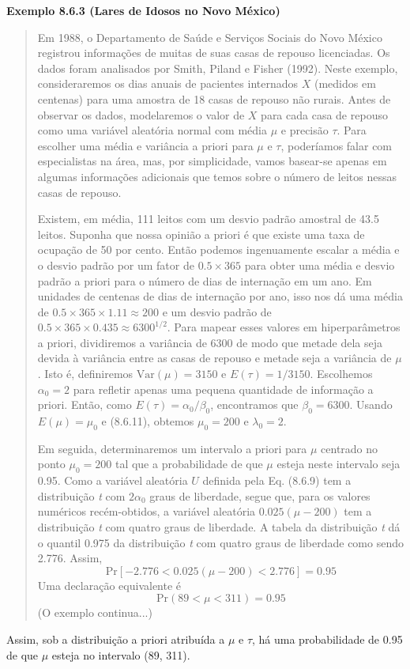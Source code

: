 \vspace{1em}
\noindent\textbf{Exemplo 8.6.3 (Lares de Idosos no Novo México)}
\begin{quote}
    Em 1988, o Departamento de Saúde e Serviços Sociais do Novo México registrou informações de muitas de suas casas de repouso licenciadas. Os dados foram analisados por Smith, Piland e Fisher (1992). Neste exemplo, consideraremos os dias anuais de pacientes internados $X$ (medidos em centenas) para uma amostra de 18 casas de repouso não rurais. Antes de observar os dados, modelaremos o valor de $X$ para cada casa de repouso como uma variável aleatória normal com média $\mu$ e precisão $\tau$. Para escolher uma média e variância a priori para $\mu$ e $\tau$, poderíamos falar com especialistas na área, mas, por simplicidade, vamos basear-se apenas em algumas informações adicionais que temos sobre o número de leitos nessas casas de repouso.

    Existem, em média, 111 leitos com um desvio padrão amostral de 43.5 leitos. Suponha que nossa opinião a priori é que existe uma taxa de ocupação de 50 por cento. Então podemos ingenuamente escalar a média e o desvio padrão por um fator de $0.5 \times 365$ para obter uma média e desvio padrão a priori para o número de dias de internação em um ano. Em unidades de centenas de dias de internação por ano, isso nos dá uma média de $0.5 \times 365 \times 1.11 \approx 200$ e um desvio padrão de $0.5 \times 365 \times 0.435 \approx 6300^{1/2}$. Para mapear esses valores em hiperparâmetros a priori, dividiremos a variância de 6300 de modo que metade dela seja devida à variância entre as casas de repouso e metade seja a variância de $\mu$. Isto é, definiremos $\text{Var}(\mu) = 3150$ e $E(\tau) = 1/3150$. Escolhemos $\alpha_0 = 2$ para refletir apenas uma pequena quantidade de informação a priori. Então, como $E(\tau) = \alpha_0/\beta_0$, encontramos que $\beta_0 = 6300$. Usando $E(\mu) = \mu_0$ e (8.6.11), obtemos $\mu_0 = 200$ e $\lambda_0 = 2$.

    Em seguida, determinaremos um intervalo a priori para $\mu$ centrado no ponto $\mu_0 = 200$ tal que a probabilidade de que $\mu$ esteja neste intervalo seja 0.95. Como a variável aleatória $U$ definida pela Eq. (8.6.9) tem a distribuição \textit{t} com $2\alpha_0$ graus de liberdade, segue que, para os valores numéricos recém-obtidos, a variável aleatória $0.025(\mu - 200)$ tem a distribuição \textit{t} com quatro graus de liberdade. A tabela da distribuição \textit{t} dá o quantil 0.975 da distribuição \textit{t} com quatro graus de liberdade como sendo 2.776. Assim,
    \begin{equation} \label{eq:8.6.13}
        \text{Pr}[-2.776 < 0.025(\mu - 200) < 2.776] = 0.95
    \end{equation}
    Uma declaração equivalente é
    \begin{equation} \label{eq:8.6.14}
        \text{Pr}(89 < \mu < 311) = 0.95
    \end{equation}
    (O exemplo continua...)
\end{quote}
\vspace{1em}
    Assim, sob a distribuição a priori atribuída a $\mu$ e $\tau$, há uma probabilidade de 0.95 de que $\mu$ esteja no intervalo (89, 311).

